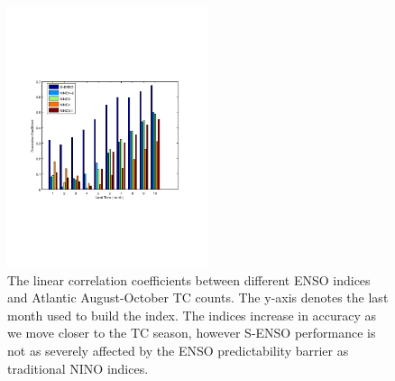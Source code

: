 \begin{figure}[htbp]
	\centering
		\includegraphics[height=3in]{figures/lead_time_bar.pdf}
	\caption{The linear correlation coefficients between different ENSO indices and Atlantic August-October TC counts. The y-axis denotes the last month used to build the index. The indices increase in accuracy as we move closer to the TC season, however S-ENSO performance is not as severely affected by the ENSO predictability barrier as traditional NINO indices.}
	\label{fig:figures_lead_time_bar}
\end{figure}

\newpage
